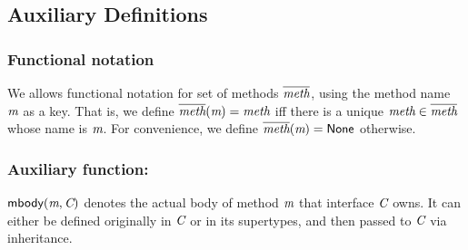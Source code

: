 
\subsection{Auxiliary Definitions}

\subsubsection{Functional notation}
We allows functional notation for set of methods $\overline{\textit{meth}}$, using the method name $\textit{m}$ as a key.
That is, we define $\overline{\textit{meth}}(\textit{m})=\textit{meth}$ iff there is a unique $\textit{meth}\in\overline{\textit{meth}}$ whose name is $\textit{m}$.
For convenience, we define $\overline{\textit{meth}}(\textit{m})=\textsf{None}$ otherwise.

\subsubsection{Auxiliary function:\mBody}

$\textsf{mbody}(\textit{m},\textit{C})$ denotes the actual body of method $\textit{m}$ that interface $\textit{C}$ owns. It can either be defined originally in $\textit{C}$ or in its supertypes, and then passed to $\textit{C}$ via inheritance.

